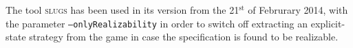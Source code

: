 \documentclass[a4paper,10pt]{IEEEtran}
\begin{document}
The tool \textsc{slugs} has been used in its version from the 21$^\mathrm{st}$ of Februrary 2014, with the parameter \texttt{--onlyRealizability} in order to switch off extracting an explicit-state strategy from the game in case the specification is found to be realizable.



\end{document}

